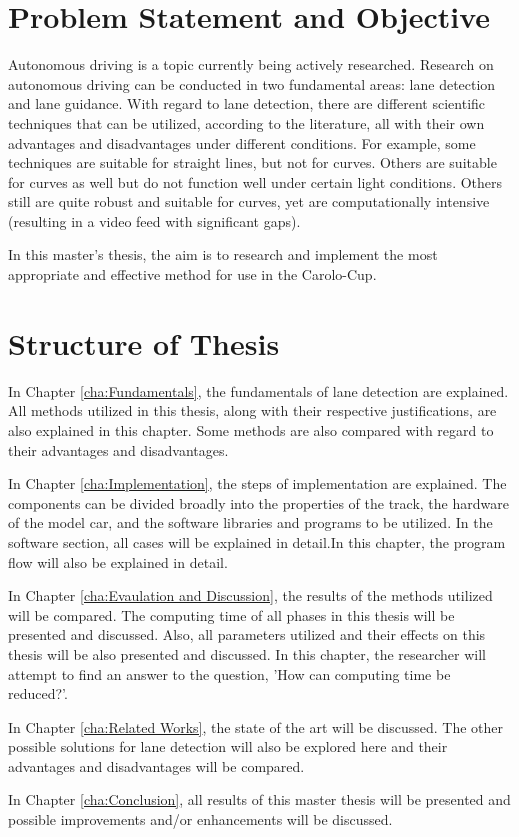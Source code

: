 \section{Problem Statement and Objective}\label{sec:Problem Statement and Objective}


Autonomous driving is a topic currently being actively researched. Research on autonomous driving can be conducted in two fundamental areas: lane detection and lane guidance. With regard to lane detection, there are different scientific techniques that can be utilized, according to the literature, all with their own advantages and disadvantages under different conditions. For example, some techniques are suitable for straight lines, but not for curves. Others are suitable for curves as well but do not function well under certain light conditions. Others still are quite robust and suitable for curves, yet are computationally intensive (resulting in a video feed with significant gaps). 

In this master's thesis, the aim is to research and implement the most appropriate and effective method for use in the Carolo-Cup.


\section{Structure of Thesis}\label{sec:Structure of Thesis}


In Chapter \ref{cha:Fundamentals}, the fundamentals of lane detection are explained. All methods utilized in this thesis, along with their respective justifications, are also explained in this chapter. Some methods are also compared with regard to their advantages and disadvantages.


In Chapter \ref{cha:Implementation}, the steps of implementation are explained. The components can be divided broadly into the properties of the track, the hardware of the model car, and the software libraries and programs to be utilized. In the software section, all cases will be explained in detail.In this chapter, the program flow will also be explained in detail.

In Chapter \ref{cha:Evaulation and Discussion}, the results of the methods utilized will be compared. The computing time of all phases in this thesis will be presented and discussed. Also, all parameters utilized and their effects on this thesis will be also presented and discussed. In this chapter, the researcher will attempt to find an answer to the question, 'How can computing time be reduced?'.

In Chapter \ref{cha:Related Works}, the state of the art will be discussed. The other possible solutions for lane detection will also be explored here and their advantages and disadvantages will be compared.

In Chapter \ref{cha:Conclusion}, all results of this master thesis will be presented and possible improvements and/or enhancements will be discussed.


